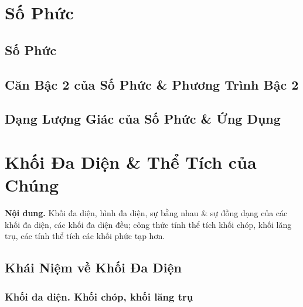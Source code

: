 \documentclass{article}
\numberwithin{equation}{section}
\begin{document}

\section{Số Phức}

\subsection{Số Phức}


\subsection{Căn Bậc 2 của Số Phức \& Phương Trình Bậc 2}


\subsection{Dạng Lượng Giác của Số Phức \& Ứng Dụng}


\section{Khối Đa Diện \& Thể Tích của Chúng}
\textsf{\textbf{Nội dung.} Khối đa diện, hình đa diện, sự bằng nhau \& sự đồng dạng của các khối đa diện, các khối đa diện đều; công thức tính thể tích khối chóp, khối lăng trụ, các tính thể tích các khối phức tạp hơn.}

\subsection{Khái Niệm về Khối Đa Diện}

\subsubsection{Khối đa diện. Khối chóp, khối lăng trụ}
\end{document}
